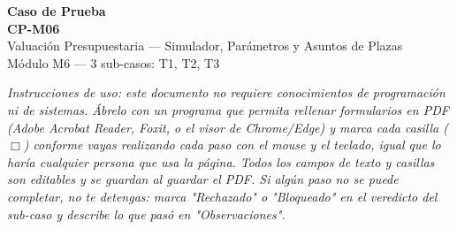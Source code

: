 \documentclass[11pt]{article}
\begin{document}
\begin{Form}

\begin{center}
  {\Huge\color{vino}\textbf{Caso de Prueba}}\\[4pt]
  {\Large\color{oro}\textbf{CP-M06}}\\[2pt]
  {\large Valuación Presupuestaria --- Simulador, Parámetros y Asuntos de Plazas}\\[2pt]
  {\small Módulo M6 --- 3 sub-casos: T1, T2, T3}
\end{center}

\vspace{6pt}
\noindent\small\textit{Instrucciones de uso: este documento no requiere conocimientos de
programación ni de sistemas. Ábrelo con un programa que permita rellenar formularios en PDF (Adobe
Acrobat Reader, Foxit, o el visor de Chrome/Edge) y marca cada casilla ($\Box$) conforme vayas
realizando cada paso con el mouse y el teclado, igual que lo haría cualquier persona que usa la
página. Todos los campos de texto y casillas son editables y se guardan al guardar el PDF. Si algún
paso no se puede completar, no te detengas: marca "Rechazado" o "Bloqueado" en el veredicto del
sub-caso y describe lo que pasó en "Observaciones".}\normalsize

\vspace{10pt}


\end{Form}
\end{document}

